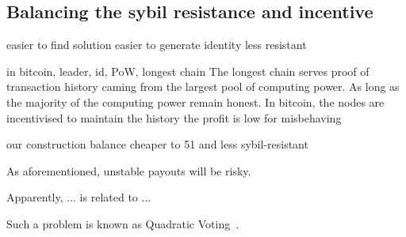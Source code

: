 \subsection{Balancing the sybil resistance and incentive}



easier to find solution
easier to generate identity
less resistant

in bitcoin, leader, id, PoW, longest chain
The longest chain serves proof of transaction history caming from the largest pool of computing power.
As long as the majority of the computing power remain honest.
In bitcoin, the nodes are incentivised to maintain the history
the profit is low for misbehaving


our construction
balance
cheaper to 51 and less sybil-resistant


As aforementioned, unstable payouts will be risky.


Apparently, 
... is related to ...

Such a problem is known as Quadratic Voting~\cite{lalley2018quadratic}.
